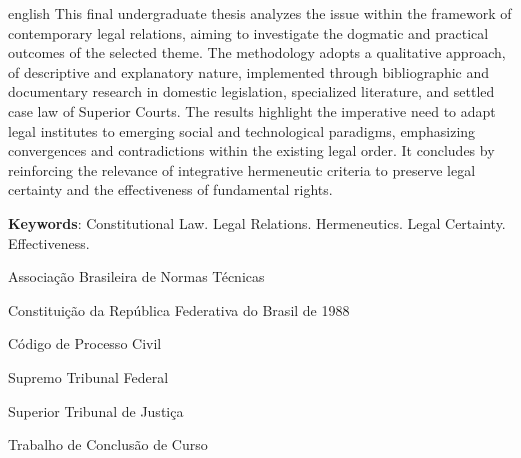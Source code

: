 \documentclass[
    12pt,               %
    openright,          %
    oneside,            %
    a4paper,            %
    english,            %
    brazil              %
]{abntex2}
\begin{document}
\begin{resumo}[Abstract]
 \begin{otherlanguage*}{english}
 \SingleSpacing
 This final undergraduate thesis analyzes the issue within the framework of contemporary legal relations, aiming to investigate the dogmatic and practical outcomes of the selected theme. The methodology adopts a qualitative approach, of descriptive and explanatory nature, implemented through bibliographic and documentary research in domestic legislation, specialized literature, and settled case law of Superior Courts. The results highlight the imperative need to adapt legal institutes to emerging social and technological paradigms, emphasizing convergences and contradictions within the existing legal order. It concludes by reinforcing the relevance of integrative hermeneutic criteria to preserve legal certainty and the effectiveness of fundamental rights.

 \textbf{Keywords}: Constitutional Law. Legal Relations. Hermeneutics. Legal Certainty. Effectiveness.
 \end{otherlanguage*}
\end{resumo}

\listoffigures*
\cleardoublepage

\listoftables*
\cleardoublepage

\begin{siglas}
  \item[ABNT] Associação Brasileira de Normas Técnicas
  \item[CF/88] Constituição da República Federativa do Brasil de 1988
  \item[CPC] Código de Processo Civil
  \item[STF] Supremo Tribunal Federal
  \item[STJ] Superior Tribunal de Justiça
  \item[TCC] Trabalho de Conclusão de Curso
\end{siglas}
\cleardoublepage

\tableofcontents*
\cleardoublepage

\textual
\end{document}

